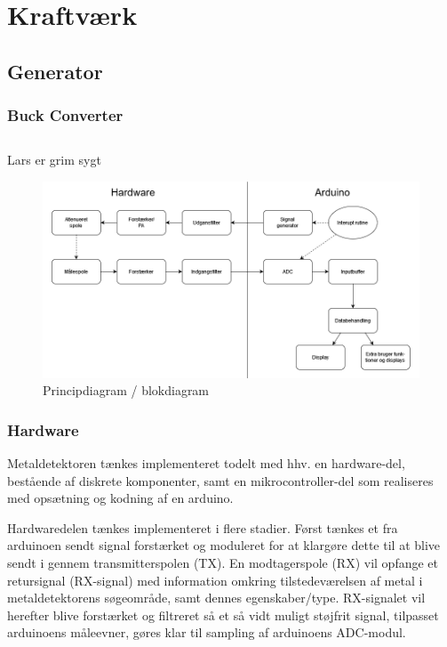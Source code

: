 \documentclass[../main.tex]{subfiles}
\begin{document}
\chapter{Kraftværk} \label{Chap:Kraftværk}

\section{Generator }
\subsection{Buck Converter}


\section{}


Lars er grim sygt









    \begin{figure}[H]
      \includegraphics[width=\textwidth]{Overleaf/Pictures/Diagrammer/Overordnet projektdiagram 1.png}
     \caption{Principdiagram / blokdiagram}
     \label{fig: Principdiagram/blokdiagram}
     \end{figure}

\subsection{Hardware}
Metaldetektoren tænkes implementeret todelt med hhv. en hardware-del, bestående af diskrete komponenter, samt en mikrocontroller-del som realiseres med opsætning og kodning af en arduino.\par
Hardwaredelen tænkes implementeret i flere stadier. Først tænkes et fra arduinoen sendt signal forstærket og moduleret for at klargøre dette til at blive sendt i gennem transmitterspolen (TX).
En modtagerspole (RX) vil opfange et retursignal (RX-signal) med information omkring tilstedeværelsen af metal i metaldetektorens søgeområde, samt dennes egenskaber/type.
RX-signalet vil herefter blive forstærket og filtreret så et så vidt muligt støjfrit signal, tilpasset arduinoens måleevner, gøres klar til sampling af arduinoens ADC-modul.
\newpage
\end{document}
